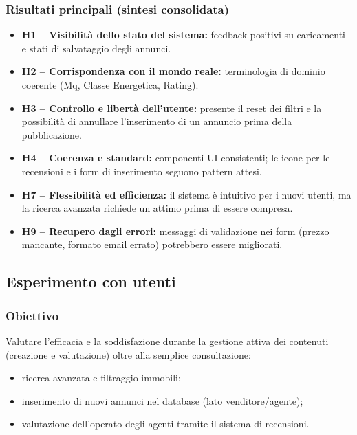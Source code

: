\documentclass[a4paper,11pt]{report}
\begin{document}
\subsubsection*{Risultati principali (sintesi consolidata)}

\begin{itemize}[nosep]
  \item \textbf{H1 -- Visibilità dello stato del sistema:} feedback positivi su caricamenti e stati di salvataggio degli annunci.
  \item \textbf{H2 -- Corrispondenza con il mondo reale:} terminologia di dominio coerente (Mq, Classe Energetica, Rating).
  \item \textbf{H3 -- Controllo e libertà dell’utente:} presente il reset dei filtri e la possibilità di annullare l'inserimento di un annuncio prima della pubblicazione.
  \item \textbf{H4 -- Coerenza e standard:} componenti UI consistenti; le icone per le recensioni e i form di inserimento seguono pattern attesi.
  \item \textbf{H7 -- Flessibilità ed efficienza:} il sistema è intuitivo per i nuovi utenti, ma la ricerca avanzata richiede un attimo prima di essere compresa.
  \item \textbf{H9 -- Recupero dagli errori:} messaggi di validazione nei form (prezzo mancante, formato email errato) potrebbero essere migliorati.
\end{itemize}

\subsection{Esperimento con utenti}

\subsubsection*{Obiettivo}

Valutare l'efficacia e la soddisfazione durante la gestione attiva dei contenuti (creazione e valutazione) oltre alla semplice consultazione:
\begin{itemize}[nosep]
  \item ricerca avanzata e filtraggio immobili;
  \item inserimento di nuovi annunci nel database (lato venditore/agente);
  \item valutazione dell'operato degli agenti tramite il sistema di recensioni.
\end{itemize}
\end{document}
